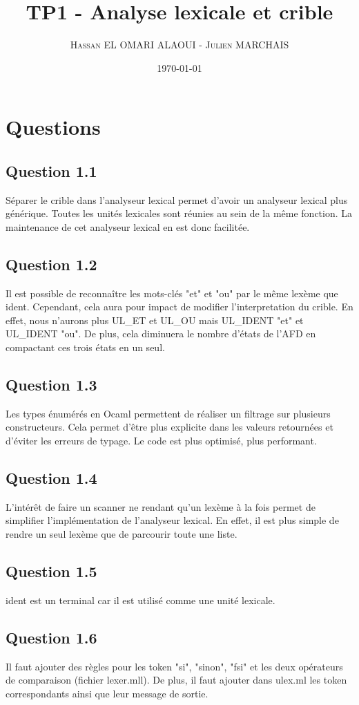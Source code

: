 \documentclass[a4paper,12pt]{article}
\title{TP1 - Analyse lexicale et crible}
\author{\textsc{Hassan EL OMARI ALAOUI} - \textsc{Julien MARCHAIS}}
\date{\today}
\begin{document}
\maketitle
\section{Questions}
\subsection{Question 1.1}
Séparer le crible dans l'analyseur lexical permet d'avoir un analyseur lexical plus générique. Toutes les unités lexicales sont réunies au sein de la même fonction. La maintenance de cet analyseur lexical en est donc facilitée.
\subsection{Question 1.2}
Il est possible de reconnaître les mots-clés "et" et "ou" par le même lexème que ident. Cependant, cela aura pour impact de modifier l'interpretation du crible. En effet, nous n'aurons plus UL\_ET et UL\_OU mais UL\_IDENT "et" et UL\_IDENT "ou". De plus, cela diminuera le nombre d'états de l'AFD en compactant ces trois états en un seul.
\subsection{Question 1.3}
Les types énumérés en Ocaml permettent de réaliser un filtrage sur plusieurs constructeurs. Cela permet d'être plus explicite dans les valeurs retournées et d'éviter les erreurs de typage. Le code est plus optimisé, plus performant.
\subsection{Question 1.4}
L'intérêt de faire un scanner ne rendant qu'un lexème à la fois permet de simplifier l'implémentation de l'analyseur lexical. En effet, il est plus simple de rendre un seul lexème que de parcourir toute une liste.
\subsection{Question 1.5}
ident est un terminal car il est utilisé comme une unité lexicale.
\subsection{Question 1.6}
Il faut ajouter des règles pour les token "si", "sinon", "fsi" et les deux opérateurs de comparaison (fichier lexer.mll). De plus, il faut ajouter dans ulex.ml les token correspondants ainsi que leur message de sortie.
\end{document}
